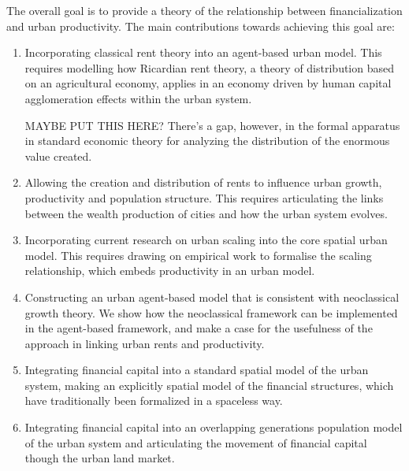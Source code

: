 The overall goal is to provide a theory of the relationship between financialization and urban productivity. The main contributions towards achieving this goal are:
\begin{enumerate}
    \item  Incorporating \gls{classical rent theory} into an \gls{agent-based} urban model. This requires modelling how \gls{Ricardian rent theory}, a theory of distribution based on an agricultural economy, applies %
in an economy driven by human capital \gls{agglomeration} effects within the urban system. 

MAYBE PUT THIS HERE? There's a gap, however, in the formal apparatus in standard economic theory for analyzing the distribution of the enormous value created. 


    \item Allowing the creation and distribution of rents to influence urban growth, productivity and  population structure. This requires articulating the links between the wealth production of cities and how the urban system evolves.

    \item Incorporating current research on \gls{urban scaling} into the core spatial urban model.  This requires drawing on empirical work to formalise the scaling relationship, which embeds productivity in an urban model. %

    \item Constructing an urban \gls{agent-based model} that is consistent with {neoclassical growth theory}. We show how the neoclassical framework can be implemented in the agent-based framework, and make a case for the usefulness of the approach in linking urban rents and productivity. %

    \item Integrating \gls{financial capital} into a standard spatial model of the urban system, making an explicitly spatial model of the financial structures, which have traditionally been formalized in a spaceless way.
    
    \item Integrating financial capital into an \gls{overlapping generations} population model of the urban system and %
articulating the movement of financial capital though the urban land market. 
    

\end{enumerate}
